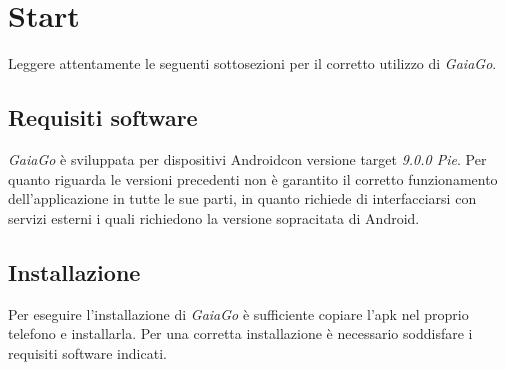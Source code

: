 \section{Start}
Leggere attentamente le seguenti sottosezioni per il corretto utilizzo di \textit{GaiaGo}.
\subsection{Requisiti software}
\textit{GaiaGo} è sviluppata per dispositivi Android\glosp con versione target \textit{9.0.0 Pie}. Per quanto riguarda le versioni precedenti non è garantito il corretto funzionamento dell'applicazione in tutte le sue parti, in quanto richiede di interfacciarsi con servizi esterni i quali richiedono la versione sopracitata di Android. 

\subsection{Installazione}
 Per eseguire l'installazione di \textit{GaiaGo} è sufficiente copiare l'apk nel proprio telefono e installarla.
 Per una corretta installazione è necessario soddisfare i requisiti software indicati.